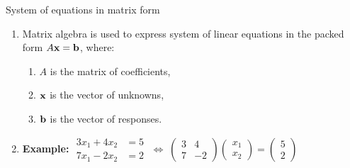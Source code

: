 \documentclass[9pt]{beamer}
\begin{document}
\begin{frame}{System of equations in matrix form}

    \begin{enumerate}[leftmargin = 0.6cm, label = $\bullet$, rightmargin = 0.4cm]
        \item Matrix algebra is used to express system of linear equations in the packed form $A{\bf x} = {\bf b}$, where:
        \begin{enumerate}[leftmargin = 0.6cm, label = $\pmb{+}$, rightmargin = 0.4cm]
            \item $A$ is the matrix of coefficients, 
            \item ${\bf x}$ is the vector of unknowns, 
            \item ${\bf b}$ is the vector of responses.
        \end{enumerate}
         
         \medskip

        \item \textbf{Example:} \quad
        $
        \begin{aligned}
            3x_1+4x_2&=5\\
            7x_1-2x_2&=2
        \end{aligned}
        \;\Longleftrightarrow\;
        \begin{pmatrix}3&4\\7&-2\end{pmatrix}
        \begin{pmatrix}x_1\\x_2\end{pmatrix}=
        \begin{pmatrix}5\\2\end{pmatrix}
        $
        \medskip


\end{enumerate}
\end{frame}
\end{document}
